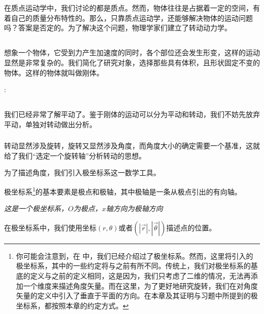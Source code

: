 \chapter[转动动力学]{}
在质点运动学中，我们讨论的都是质点。然而，物体往往是占据着一定的空间，有着自己的质量分布特性的。那么，只靠质点运动学，还能够解决物体的运动问题吗？答案是否定的。为了解决这个问题，物理学家们建立了转动动力学。
\section[刚体]{}
想象一个物体，它受到力产生加速度的同时，各个部位还会发生形变，这样的运动显然是非常复杂的。我们简化了研究对象，选择那些具有体积，且形状固定不变的物体。这样的物体就叫做刚体。
\begin{Itemize}
	\item {}:
\end{Itemize}
\section[转动]{}
我们已经非常了解平动了。鉴于刚体的运动可以分为平动和转动，我们不妨先放弃平动，单独对转动做出分析。

\subsection[极坐标系]{}
转动显然涉及旋转，旋转又显然涉及角度，而角度大小的确定需要一个基准，这就给了我们“选定一个旋转轴”分析转动的思想。

为了描述角度，我们引入极坐标系这一数学工具。

极坐标系\footnote{你可能会注意到，在 中，我们已经介绍过了极坐标系。然而，这里将引入的极坐标系，其中的一些约定将与之前有所不同。传统上，我们对极坐标系的基底的定义与之前的定义相同，这是因为，我们只考虑了二维的情况，无法再添加一个维度来描述角度矢量。而在这里，为了更好地研究旋转，我们在对角度矢量的定义中引入了垂直于平面的方向。在本章及其证明与习题中所提到的极坐标系，都按照本章的约定方式。}的基本要素是极点和极轴，其中极轴是一条从极点引出的有向轴。
\begin{center}
	\em 这是一个极坐标系，$O$为极点，$x$轴方向为极轴方向
\end{center}
在极坐标系中，我们使用坐标$(r,\theta)$或者$(|\vec{r}|,|\vec{\theta}|)$描述点的位置。


